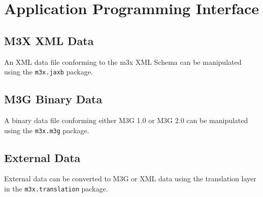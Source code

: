 \chapter{Application Programming Interface}

\section{M3X XML Data}
An XML data file conforming to the m3x XML Schema can be manipulated using the \texttt{m3x.jaxb} package.

\section{M3G Binary Data}
A binary data file conforming either M3G 1.0 or M3G 2.0 can be manipulated using the \texttt{m3x.m3g} package.

\section{External Data}
External data can be converted to M3G or XML data using the translation layer in the \texttt{m3x.translation} package.


